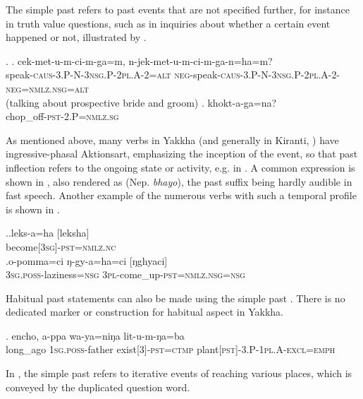 The simple past  refers to past events that are not specified further, for instance in truth value questions, such as  in inquiries about whether a certain event happened or not, illustrated by \Next. 

\ex. \ag.  cek-met-u-m-ci-m-ga=m,                                    n-jek-met-u-m-ci-m-ga-n=ha=m?\\
speak{\scshape -caus-3.P-N-3nsg.P-2pl.A-2=alt} {\scshape neg-}speak{\scshape -caus-3.P-N-3nsg.P-2pl.A-2-neg=nmlz.nsg=alt}\\
 (talking about prospective bride and groom) 
\bg. khokt-a-ga=na?\\
chop\_off{\scshape -pst-2.P=nmlz.sg}\\
 


As mentioned above, many verbs in Yakkha (and generally in Kiranti, \citealt[512]{Ebert2003Kiranti}) have ingressive-phasal Aktionsart, emphasizing the inception of the event, so that past inflection refers to the ongoing state or activity, e.g. in \Last[b]. A common expression is shown in \Next[a], also rendered as  (Nep. \emph{bhayo}), the past suffix being hardly audible in fast speech. Another example of the numerous verbs with such a temporal profile is shown in \Next[b].

\ex.\ag.leks-a=ha [leksha]\\
become{\scshape [3sg]-pst=nmlz.nc}\\
\bg.o-pomma=ci ŋ-gy-a=ha=ci [ŋghyaci]\\
{\scshape 3sg.poss-}laziness{\scshape =nsg} {\scshape 3pl-}come\_up{\scshape -pst=nmlz.nsg=nsg}\\

Habitual past statements can also be made using the simple past \Next. There is no dedicated marker or construction for habitual aspect in Yakkha.

\exg. encho,        a-ppa             wa-ya=niŋa               lit-u-m-ŋa=ba\\
long\_ago {\scshape 1sg.poss-}father exist{\scshape [3]-pst=ctmp} plant{\scshape [pst]-3.P-1pl.A-excl=emph}\\
 

In \Next, the simple past refers to iterative events of reaching various places, which is conveyed by the duplicated question word.

